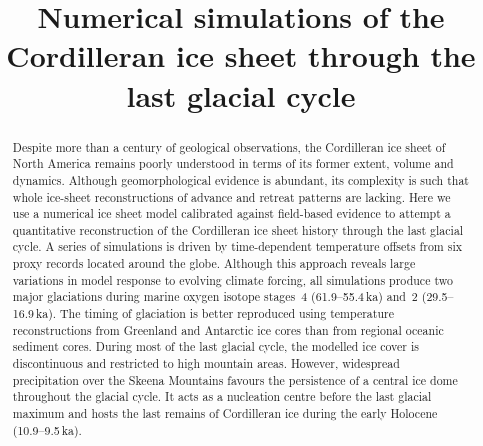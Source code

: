 \documentclass[tc]{copernicus}
\begin{document}

\title{Numerical simulations of the Cordilleran ice sheet
       through the last glacial cycle}




\received{}
\pubdiscuss{}
\revised{}
\accepted{}
\published{}

\maketitle

\begin{abstract}

  Despite more than a century of geological observations, the Cordilleran ice
  sheet of North America remains poorly understood in terms of its former
  extent, volume and dynamics. Although geomorphological evidence is abundant,
  its complexity is such that whole ice-sheet reconstructions of advance and
  retreat patterns are lacking. Here we use a numerical ice sheet model
  calibrated against field-based evidence to attempt a quantitative
  reconstruction of the Cordilleran ice sheet history through the last glacial
  cycle. A series of simulations is driven by time-dependent temperature
  offsets from six proxy records located around the globe. Although this
  approach reveals large variations in model response to evolving climate
  forcing, all simulations produce two major glaciations during
  marine oxygen isotope stages~4 (61.9--55.4\,ka) and~2
  (29.5--16.9\,ka). The timing of glaciation is
  better reproduced using temperature reconstructions from Greenland and
  Antarctic ice cores than from regional oceanic sediment cores. During most of
  the last glacial cycle, the modelled ice cover is discontinuous and
  restricted to high mountain areas. However, widespread precipitation over the
  Skeena Mountains favours the persistence of a central ice dome throughout the
  glacial cycle. It acts as a nucleation centre before the last glacial maximum
  and hosts the last remains of Cordilleran ice during the
  early Holocene (10.9--9.5\,ka).

\end{abstract}
\end{document}
